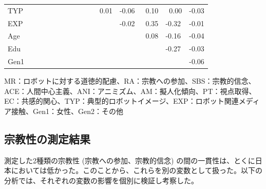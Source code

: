 \documentclass[a4j,12pt]{jreport}
\begin{document}
\begin{table}[H]
{\begin{threeparttable}
\begin{tabular}{@{}lllllllllllllll@{}}
TYP  &    &       &            &            &            &            &            &            &            & ~0.01 & -0.06      & ~0.10 & ~0.00 & -0.03      \\
EXP  &    &       &            &            &            &            &            &            &            &            & -0.02      & ~0.35 & -0.32      & -0.01      \\
Age  &    &       &            &            &            &            &            &            &            &            &            & ~0.08 & -0.16      & -0.04      \\
Edu  &    &       &            &            &            &            &            &            &            &            &            &            & -0.27      & -0.03      \\
Gen1 &    &       &            &            &            &            &            &            &            &            &            &            &            & -0.06      \\
 \bottomrule
\end{tabular}
    \begin{tablenotes}
      \small
      \item MR：ロボットに対する道徳的配慮、RA：宗教への参加、SBS：宗教的信念、ACE：人間中心主義、ANI：アニミズム、AM：擬人化傾向、PT：視点取得、EC：共感的関心、TYP：典型的ロボットイメージ、EXP：ロボット関連メディア接触、Gen1：女性、Gen2：その他
    \end{tablenotes}
  \end{threeparttable}
  }
\end{table}







\subsection{宗教性の測定結果}
測定した2種類の宗教性 (宗教への参加、宗教的信念) の間の一貫性は、とくに日本においては低かった。このことから、これらを別の変数として扱った。以下の分析では、それぞれの変数の影響を個別に検証し考察した。
\end{document}
